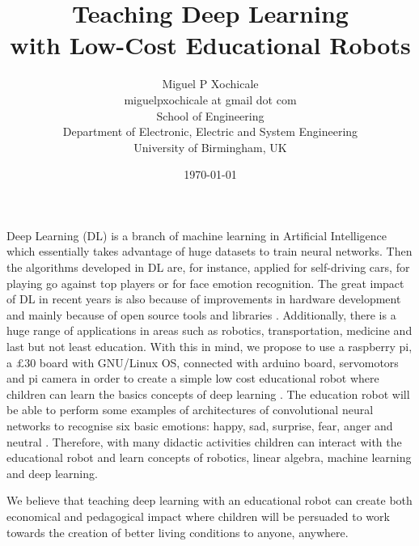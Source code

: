 \documentclass[11pt]{article}
\author{Miguel P Xochicale\\
miguelpxochicale at gmail dot com\\
School of Engineering\\
Department of Electronic, Electric and System Engineering\\
University of Birmingham, UK}
\title{Teaching Deep Learning  \\ with Low-Cost Educational Robots} %
\date{\today}
\begin{document}
\maketitle


Deep Learning (DL) is a branch of machine learning in Artificial Intelligence
which essentially takes advantage of huge datasets to train neural networks.
Then the algorithms developed in DL are, for instance, applied for self-driving cars,
for playing go against top players or for face emotion recognition. The great
impact of DL in recent years is also because of improvements in hardware development and
mainly because of open source tools and libraries \cite{matelabs2017}.
Additionally, there is a huge range of applications in areas such as robotics,
transportation, medicine and last but not least education.
With this in mind, we propose to use a raspberry pi, a $\pounds$30 board with
GNU/Linux OS, connected with arduino board, servomotors and pi camera in order
to create a simple low cost educational robot where children can learn the basics
concepts of deep learning  \cite{durr2015}.
The education robot will be able to perform some examples of architectures of
convolutional neural networks to recognise six basic emotions:
happy, sad, surprise, fear, anger and neutral \cite{ho2016, Ruiz-Garcia2016}.
Therefore, with many didactic activities children can interact with the educational
robot and learn concepts of robotics, linear algebra, machine learning and deep learning.

We believe that teaching deep learning with an educational robot can create
both economical and pedagogical impact where children will be persuaded to work
towards the creation of better living conditions to anyone, anywhere.




% 
\end{document}
